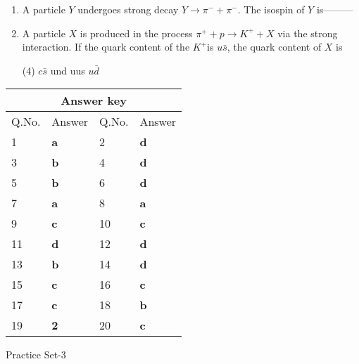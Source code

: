 \begin{enumerate}
	\item  A particle $Y$ undergoes strong decay $Y \rightarrow \pi^{-}+\pi^{-}$. The isospin of $Y$ is---------
	{}

	\item  A particle $X$ is produced in the process $\pi^{+}+p \rightarrow K^{+}+X$ via the strong interaction. If the quark content of the $K^{+}$is $u \bar{s}$, the quark content of $X$ is
{}
	 \begin{tasks}(4)
		\task[\textbf{a.}]$c \bar{s}$
		\task[\textbf{b.}]und
		\task[\textbf{c.}]uus
		\task[\textbf{d.}]$u \bar{d}$ 
	\end{tasks}

\end{enumerate}
\setlength\arrayrulewidth{1pt}
\begin{table}[H]
	\centering
	\begin{tabular}{|p{1.5cm}|p{1.5cm}||p{1.5cm}|p{1.5cm}|}
		\hline
		\multicolumn{4}{|c|}{\textbf{Answer key}}\\\hline\hline
		\rowcolor{ocrel}Q.No.&Answer&Q.No.&Answer\\\hline
		1&\textbf{a} &2&\textbf{d}\\\hline 
		3&\textbf{b} &4&\textbf{d} \\\hline
		5&\textbf{b} &6&\textbf{d} \\\hline
		7&\textbf{a}&8&\textbf{a}\\\hline
		9&\textbf{c}&10&\textbf{c}\\\hline
		11&\textbf{d} &12&\textbf{d}\\\hline
		13&\textbf{b}&14&\textbf{d}\\\hline
		15&\textbf{c}&16&\textbf{c} \\\hline
		17&\textbf{c}&18&\textbf{b}\\\hline
		19&\textbf{2}&20&\textbf{c}\\\hline
	\end{tabular}
\end{table}
\begin{abox}
Practice Set-3
\end{abox}
